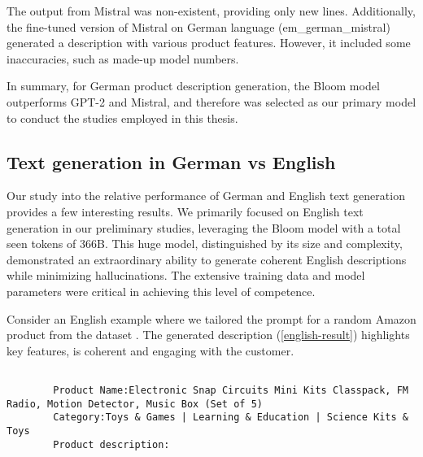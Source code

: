 The output from Mistral was non-existent, providing only new lines. Additionally, the fine-tuned version of Mistral on German language (em\_german\_mistral) generated a description with various product features. However, it included some inaccuracies, such as made-up model numbers.

In summary, for German product description generation, the Bloom model outperforms GPT-2 and Mistral, and therefore was selected as our primary model to conduct the studies employed in this thesis.

\subsection{Text generation in German vs English}

Our study into the relative performance of German and English text generation provides a few interesting results. We primarily focused on English text generation in our preliminary studies, leveraging the Bloom model with a total seen tokens of 366B. This huge model, distinguished by its size and complexity, demonstrated an extraordinary ability to generate coherent English descriptions while minimizing hallucinations. The extensive training data and model parameters were critical in achieving this level of competence.

Consider an English example where we tailored the prompt for a random Amazon product from the dataset \cite{amazon_data}. The generated description (\autoref{english-result}) highlights key features, is coherent and engaging with the customer.

{\tiny
	\begin{lstlisting}[breaklines=true, caption={prompt used for English text geneartion}, captionpos=b]
		
		Product Name:Electronic Snap Circuits Mini Kits Classpack, FM Radio, Motion Detector, Music Box (Set of 5) 
		Category:Toys & Games | Learning & Education | Science Kits & Toys 
		Product description:
		
	\end{lstlisting}
}

\begin{center}
	\par
\end{center}

